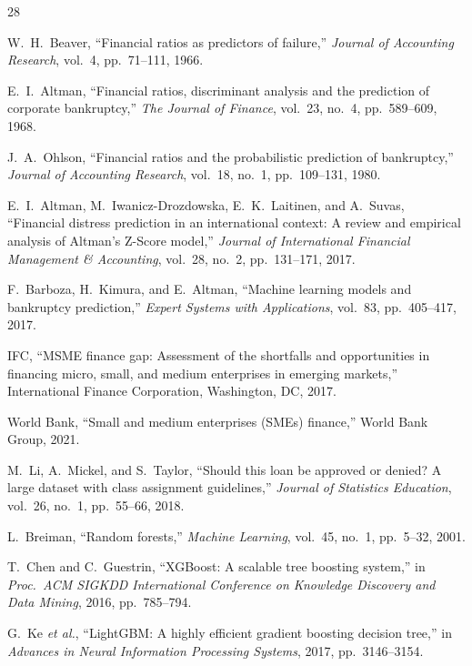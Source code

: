 \documentclass[12pt,a4paper]{report}
\begin{document}
\begin{thebibliography}{28}

 W.~H.~Beaver, ``Financial ratios as predictors of failure,'' \textit{Journal of Accounting Research}, vol.~4, pp.~71--111, 1966.

 E.~I.~Altman, ``Financial ratios, discriminant analysis and the prediction of corporate bankruptcy,'' \textit{The Journal of Finance}, vol.~23, no.~4, pp.~589--609, 1968.

 J.~A.~Ohlson, ``Financial ratios and the probabilistic prediction of bankruptcy,'' \textit{Journal of Accounting Research}, vol.~18, no.~1, pp.~109--131, 1980.

 E.~I.~Altman, M.~Iwanicz-Drozdowska, E.~K.~Laitinen, and A.~Suvas, ``Financial distress prediction in an international context: A review and empirical analysis of Altman's Z-Score model,'' \textit{Journal of International Financial Management \& Accounting}, vol.~28, no.~2, pp.~131--171, 2017.

 F.~Barboza, H.~Kimura, and E.~Altman, ``Machine learning models and bankruptcy prediction,'' \textit{Expert Systems with Applications}, vol.~83, pp.~405--417, 2017.

 IFC, ``MSME finance gap: Assessment of the shortfalls and opportunities in financing micro, small, and medium enterprises in emerging markets,'' International Finance Corporation, Washington, DC, 2017.

 World Bank, ``Small and medium enterprises (SMEs) finance,'' World Bank Group, 2021.

 M.~Li, A.~Mickel, and S.~Taylor, ``Should this loan be approved or denied? A large dataset with class assignment guidelines,'' \textit{Journal of Statistics Education}, vol.~26, no.~1, pp.~55--66, 2018.

 L.~Breiman, ``Random forests,'' \textit{Machine Learning}, vol.~45, no.~1, pp.~5--32, 2001.

 T.~Chen and C.~Guestrin, ``XGBoost: A scalable tree boosting system,'' in \textit{Proc.\ ACM SIGKDD International Conference on Knowledge Discovery and Data Mining}, 2016, pp.~785--794.

 G.~Ke \textit{et al.}, ``LightGBM: A highly efficient gradient boosting decision tree,'' in \textit{Advances in Neural Information Processing Systems}, 2017, pp.~3146--3154.


\end{thebibliography}
\end{document}
